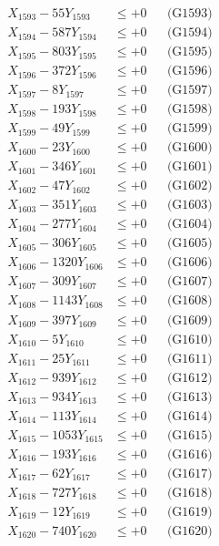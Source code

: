 \documentclass[a4paper,10pt]{article}
\begin{document}
{\begin{align}
X_{1593} - 55Y_{1593} &\leq +0 && \text{(G1593)} \\
X_{1594} - 587Y_{1594} &\leq +0 && \text{(G1594)} \\
X_{1595} - 803Y_{1595} &\leq +0 && \text{(G1595)} \\
X_{1596} - 372Y_{1596} &\leq +0 && \text{(G1596)} \\
X_{1597} - 8Y_{1597} &\leq +0 && \text{(G1597)} \\
X_{1598} - 193Y_{1598} &\leq +0 && \text{(G1598)} \\
X_{1599} - 49Y_{1599} &\leq +0 && \text{(G1599)} \\
X_{1600} - 23Y_{1600} &\leq +0 && \text{(G1600)} \\
\allowbreak
X_{1601} - 346Y_{1601} &\leq +0 && \text{(G1601)} \\
X_{1602} - 47Y_{1602} &\leq +0 && \text{(G1602)} \\
X_{1603} - 351Y_{1603} &\leq +0 && \text{(G1603)} \\
X_{1604} - 277Y_{1604} &\leq +0 && \text{(G1604)} \\
X_{1605} - 306Y_{1605} &\leq +0 && \text{(G1605)} \\
X_{1606} - 1320Y_{1606} &\leq +0 && \text{(G1606)} \\
X_{1607} - 309Y_{1607} &\leq +0 && \text{(G1607)} \\
X_{1608} - 1143Y_{1608} &\leq +0 && \text{(G1608)} \\
X_{1609} - 397Y_{1609} &\leq +0 && \text{(G1609)} \\
X_{1610} - 5Y_{1610} &\leq +0 && \text{(G1610)} \\
\allowbreak
X_{1611} - 25Y_{1611} &\leq +0 && \text{(G1611)} \\
X_{1612} - 939Y_{1612} &\leq +0 && \text{(G1612)} \\
X_{1613} - 934Y_{1613} &\leq +0 && \text{(G1613)} \\
X_{1614} - 113Y_{1614} &\leq +0 && \text{(G1614)} \\
X_{1615} - 1053Y_{1615} &\leq +0 && \text{(G1615)} \\
X_{1616} - 193Y_{1616} &\leq +0 && \text{(G1616)} \\
X_{1617} - 62Y_{1617} &\leq +0 && \text{(G1617)} \\
X_{1618} - 727Y_{1618} &\leq +0 && \text{(G1618)} \\
X_{1619} - 12Y_{1619} &\leq +0 && \text{(G1619)} \\
X_{1620} - 740Y_{1620} &\leq +0 && \text{(G1620)} \\

\end{align}}
\end{document}
